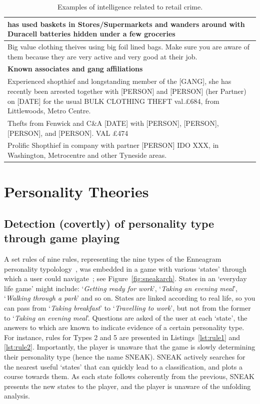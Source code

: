 \documentclass{llncs}
\begin{document}
\begin{table}[!ht]
\begin{tabularx}{\textwidth}{|X|}
has used baskets in Stores/Supermarkets and wanders around with
Duracell batteries hidden under a few groceries \\
\hline
Big value clothing theives using big foil lined bags. Make sure you
are aware of them because they are very active and very good at their
job. \\
\hline
{\textbf{Known associates and gang affiliations}} \\
\hline
Experienced shopthief and longstanding member of the [GANG], she has
recently been arrested together with [PERSON] and [PERSON] (her
Partner) on [DATE] for the usual BULK CLOTHING THEFT val.\pounds 684,
from Littlewoods, Metro Centre. \\
\hline
Thefts from Fenwick and C\&A [DATE] with [PERSON], [PERSON], [PERSON],
and [PERSON]. VAL \pounds 474\\
\hline
Prolific Shopthief in company with partner [PERSON] IDO XXX, in
Washington, Metrocentre and other Tyneside areas. \\
\hline
\end{tabularx}%
\caption{Examples of intelligence related to retail crime.}
\label{tab:intelligence}
\end{table}


\section{Personality Theories}\label{personality}

\subsection{Detection (covertly) of personality type through game playing}\label{detectiongp}

A set rules of nine rules, representing the nine types of the
Enneagram personality typolology~\cite{newgent-et-al:2004}, was embedded in a game with various
`states' through which a user could navigate~\cite{oatleymsc:1996}; see
Figure~\ref{fig:sneakarch}. States in an `everyday life game' might
include: `{\emph{Getting ready for work}}', `{\emph{Taking an evening meal}}', `{\emph{Walking
through a park}}' and so on. States are linked according to real life,
so you can pass from `{\emph{Taking breakfast}}' to `{\emph{Travelling to work}}', but
not from the former to `{\emph{Taking an evening meal}}'. Questions are asked
of the user at each `state', the answers to which are known to
indicate evidence of a certain personality type. For instance, rules
for Types 2 and 5 are presented in Listings~\ref{lst:rule1} and
\ref{lst:rule2}. Importantly, the player is unaware that the game is
slowly determining their personality type (hence the name
SNEAK). SNEAK  actively searches for the nearest useful `states'
that can quickly lead to a classification, and plots a course
towards them. As each state follows coherently from the previous,
SNEAK presents the new states to the player, and the player is unaware
of the unfolding analysis.
\end{document}
